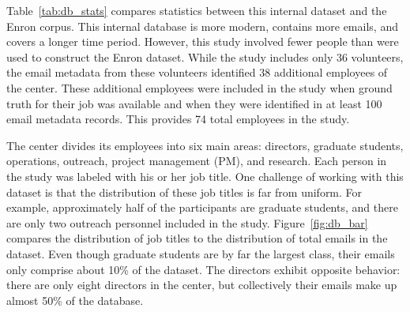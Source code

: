 \documentclass[10pt,twocolumn,conference]{IEEEtran}
\begin{document}
Table~\ref{tab:db_stats} compares statistics between this internal dataset and the Enron corpus.
This internal database is more modern, contains more emails, and covers a longer time period.
However, this study involved fewer people than were used to construct the Enron dataset.
While the study includes only 36 volunteers, the email metadata from these volunteers identified 38 additional employees of the center.
These additional employees were included in the study when ground truth for their job was available and when they were identified in at least 100 email metadata records.
This provides 74 total employees in the study.

\begin{table}[t]
\centering
\caption{A comparison between the internal dataset and the Enron email corpus.}
\label{tab:db_stats}
\end{table}


The center divides its employees into six main areas: directors, graduate students, operations, outreach, project management (PM), and research.
Each person in the study was labeled with his or her job title.
One challenge of working with this dataset is that the distribution of these job titles is far from uniform.
For example, approximately half of the participants are graduate students, and there are only two outreach personnel included in the study.
Figure~\ref{fig:db_bar} compares the distribution of job titles to the distribution of total emails in the dataset.
Even though graduate students are by far the largest class, their emails only comprise about 10\% of the dataset.
The directors exhibit opposite behavior: there are only eight directors in the center, but collectively their emails make up almost 50\% of the database.
\end{document}
